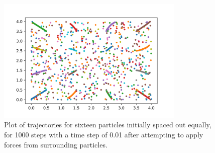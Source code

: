 \documentclass{article}
\begin{document}
\begin{figure}[H]
	\centering
	\includegraphics[width=0.8\textwidth]{../images/bdry_2.png}
	\caption{Plot of trajectories for sixteen particles initially spaced out equally, for 1000 steps with a time step of 0.01 after attempting to apply forces from surrounding particles.}
	\label{fig:q3_bdry_2}
\end{figure}
\end{document}
